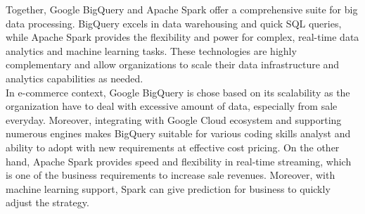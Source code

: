 Together, Google BigQuery and Apache Spark offer a comprehensive suite for big data processing.
BigQuery excels in data warehousing and quick SQL queries, while Apache Spark provides the
flexibility and power for complex, real-time data analytics and machine learning tasks. These
technologies are highly complementary and allow organizations to scale their data infrastructure and
analytics capabilities as needed.\\
In e-commerce context, Google BigQuery is chose based on its scalability as the organization have to 
deal with excessive amount of data, especially from sale everyday. Moreover, integrating with Google 
Cloud ecosystem and supporting numerous engines makes BigQuery suitable for various coding skills analyst
and ability to adopt with new requirements at effective cost pricing. On the other hand, Apache Spark provides
speed and flexibility in real-time streaming, which is one of the business requirements to increase sale revenues.
Moreover, with machine learning support, Spark can give prediction for business to quickly adjust the strategy.
